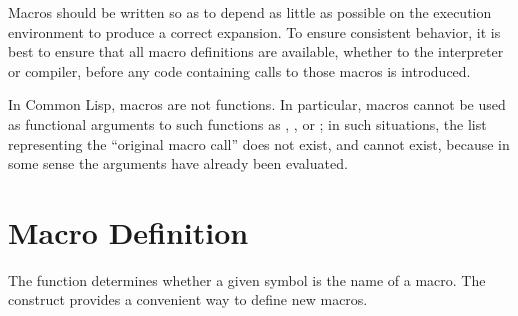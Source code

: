 Macros should be written so as to depend as little as possible
on the execution environment to produce a correct expansion.  To ensure
consistent behavior, it is best to ensure that all macro definitions are
available, whether to the interpreter or compiler, before any code
containing calls to those macros is introduced.

In Common Lisp, macros are not functions.
In particular, macros cannot be used as
functional arguments to such functions as , ,
or ; in such situations, the list representing the ``original macro
call'' does not exist, and cannot exist, because in some sense the arguments
have already been evaluated.

\section{Macro Definition}

The function  determines whether a given symbol
is the name of a macro.  The  construct provides
a convenient way to define new macros.

